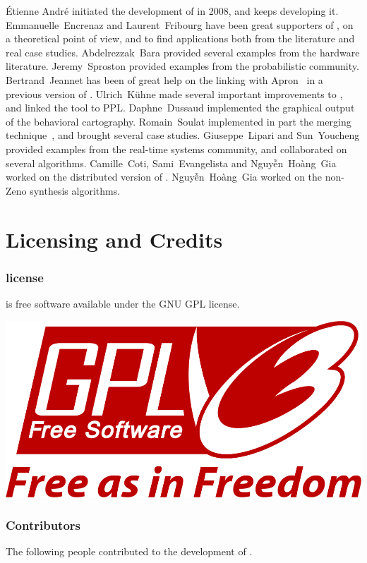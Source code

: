 \sloppy
\'Etienne André initiated the development of \imitator{} in 2008, and keeps developing it.
Emmanuelle~Encrenaz and Laurent~Fribourg have been great supporters of \imitator{}, on a theoretical point of view, and to find applications both from the literature and real case studies.
Abdelrezzak~Bara provided several examples from the hardware literature.
Jeremy~Sproston provided examples from the probabilistic community.
Bertrand~Jeannet has been of great help on the linking with Apron~\cite{JM09} in a previous version of \imitator{}.
Ulrich~K\"uhne made several important improvements to \imitator{}, and linked the tool to PPL.
Daphne~Dussaud implemented the graphical output of the behavioral cartography.
Romain~Soulat implemented in part the merging technique~\cite{AFS13atva}, and brought several case studies.
Giuseppe~Lipari and Sun~Youcheng provided examples from the real-time systems community, and collaborated on several algorithms.
Camille~Coti, Sami~Evangelista and Nguy\~{ê}n~Hoàng~Gia worked on the distributed version of \imitator{}.
Nguy\~{ê}n~Hoàng~Gia worked on the non-Zeno synthesis algorithms.



\chapter{Licensing and Credits}

\subsection*{\imitator{} license}
\imitator{} is free software available under the GNU GPL license.

\begin{center}
	\includegraphics[width=.3\textwidth]{images/GPLv3_Logo.png}
\end{center}

\bigskip

\subsection*{Contributors}
The following people contributed to the development of \imitator{}.


